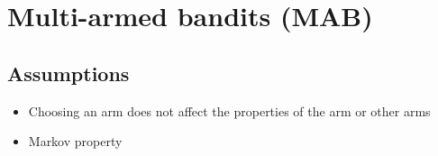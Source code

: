 \section{Multi-armed bandits (MAB)}

\subsection{Assumptions}

\begin{itemize}
      \item
            Choosing an arm does not affect the properties of the arm or other arms
      \item
            Markov property
\end{itemize}
